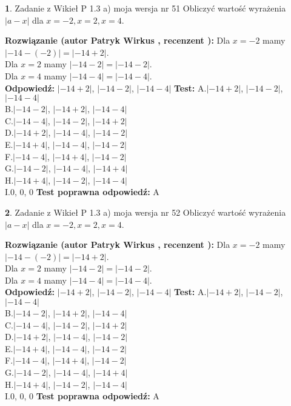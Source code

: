 \documentclass[12pt, a4paper]{article}
\theoremstyle{definition} %
\newtheorem{zad}{}
\newcommand{\zadStart}[1]{\begin{zad}#1\newline}
\newcommand{\zadStop}{\end{zad}}
\newcommand{\rozwStart}[2]{\noindent \textbf{Rozwiązanie (autor #1 , recenzent #2): }\newline}
\newcommand{\rozwStop}{\newline}
\newcommand{\odpStart}{\noindent \textbf{Odpowiedź:}\newline}
\newcommand{\odpStop}{\newline}
\newcommand{\testStart}{\noindent \textbf{Test:}\newline}
\newcommand{\testStop}{\newline}
\newcommand{\kluczStart}{\noindent \textbf{Test poprawna odpowiedź:}\newline}
\newcommand{\kluczStop}{\newline}
\begin{document}
\zadStart{Zadanie z Wikieł P 1.3 a) moja wersja nr 51}
Obliczyć wartość wyrażenia $|a - x|$ dla $x=-2,x=2,x=4$.
\zadStop
\rozwStart{Patryk Wirkus}{}
Dla $x = -2$ mamy $|-14 - (-2)| = |-14 + 2|$.\\
Dla $x = 2$ mamy $|-14 - 2| = |-14 - 2|$.\\
Dla $x = 4$ mamy $|-14 - 4| = |-14 - 4|$.\\
\rozwStop
\odpStart
$|-14 + 2|$, $|-14 - 2|$, $|-14 - 4|$
\odpStop
\testStart
A.$|-14 + 2|$, $|-14 - 2|$, $|-14 - 4|$\\
B.$|-14 - 2|$, $|-14 + 2|$, $|-14 - 4|$\\
C.$|-14 - 4|$, $|-14 - 2|$, $|-14 + 2|$\\
D.$|-14 + 2|$, $|-14 - 4|$, $|-14 - 2|$\\
E.$|-14 + 4|$, $|-14 - 4|$, $|-14 - 2|$\\
F.$|-14 - 4|$, $|-14 + 4|$, $|-14 - 2|$\\
G.$|-14 - 2|$, $|-14 - 4|$, $|-14 + 4|$\\
H.$|-14 + 4|$, $|-14 - 2|$, $|-14 - 4|$\\
I.$0$, $0$, $0$
\testStop
\kluczStart
A
\kluczStop



\zadStart{Zadanie z Wikieł P 1.3 a) moja wersja nr 52}
Obliczyć wartość wyrażenia $|a - x|$ dla $x=-2,x=2,x=4$.
\zadStop
\rozwStart{Patryk Wirkus}{}
Dla $x = -2$ mamy $|-14 - (-2)| = |-14 + 2|$.\\
Dla $x = 2$ mamy $|-14 - 2| = |-14 - 2|$.\\
Dla $x = 4$ mamy $|-14 - 4| = |-14 - 4|$.\\
\rozwStop
\odpStart
$|-14 + 2|$, $|-14 - 2|$, $|-14 - 4|$
\odpStop
\testStart
A.$|-14 + 2|$, $|-14 - 2|$, $|-14 - 4|$\\
B.$|-14 - 2|$, $|-14 + 2|$, $|-14 - 4|$\\
C.$|-14 - 4|$, $|-14 - 2|$, $|-14 + 2|$\\
D.$|-14 + 2|$, $|-14 - 4|$, $|-14 - 2|$\\
E.$|-14 + 4|$, $|-14 - 4|$, $|-14 - 2|$\\
F.$|-14 - 4|$, $|-14 + 4|$, $|-14 - 2|$\\
G.$|-14 - 2|$, $|-14 - 4|$, $|-14 + 4|$\\
H.$|-14 + 4|$, $|-14 - 2|$, $|-14 - 4|$\\
I.$0$, $0$, $0$
\testStop
\kluczStart
A
\kluczStop
\end{document}
